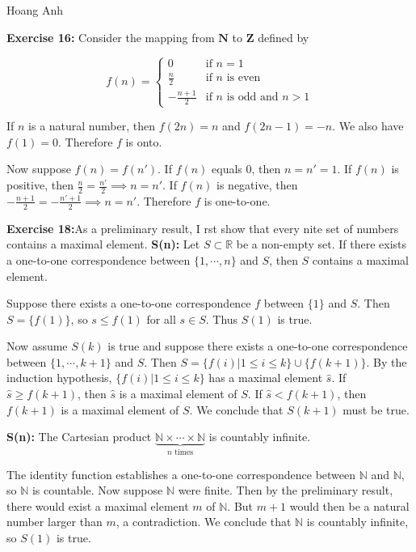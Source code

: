 Hoang Anh


\textbf{Exercise 16:} Consider the mapping from $\mathbf{N}$ to $\mathbf{Z}$ defined by

\[ f(n) = \begin{cases}
0 & \text{if } n = 1 \\
\frac{n}{2} & \text{if } n \text{ is even} \\
-\frac{n+1}{2} & \text{if } n \text{ is odd and } n > 1
\end{cases} \]

If $n$ is a natural number, then $f(2n) = n$ and $f(2n-1) = -n$. We also have $f(1) = 0$. Therefore $f$ is onto.

Now suppose $f(n) = f(n')$. If $f(n)$ equals 0, then $n = n' = 1$. If $f(n)$ is positive, then $\frac{n}{2} = \frac{n'}{2} \implies n = n'$. If $f(n)$ is negative, then $-\frac{n+1}{2} = -\frac{n'+1}{2} \implies n = n'$. Therefore $f$ is one-to-one.

\textbf{Exercise 18:}As a preliminary result, I rst show that every nite set of numbers contains a maximal element.
\textbf{S(n):} Let $S \subset \mathbb{R}$ be a non-empty set. If there exists a one-to-one correspondence between $\{1, \cdots, n\}$ and $S$, then $S$ contains a maximal element.

Suppose there exists a one-to-one correspondence $f$ between $\{1\}$ and $S$. Then $S = \{f(1)\}$, so $s \le f(1)$ for all $s \in S$. Thus $S(1)$ is true.

Now assume $S(k)$ is true and suppose there exists a one-to-one correspondence between $\{1, \cdots, k+1\}$ and $S$. Then $S = \{f(i) | 1 \le i \le k\} \cup \{f(k+1)\}$. By the induction hypothesis, $\{f(i) | 1 \le i \le k\}$ has a maximal element $\hat{s}$. If $\hat{s} \ge f(k+1)$, then $\hat{s}$ is a maximal element of $S$. If $\hat{s} < f(k+1)$, then $f(k+1)$ is a maximal element of $S$. We conclude that $S(k+1)$ must be true.

\vspace{1em}

\textbf{S(n):} The Cartesian product $\underbrace{\mathbb{N} \times \cdots \times \mathbb{N}}_{n \text{ times}}$ is countably infinite.

The identity function establishes a one-to-one correspondence between $\mathbb{N}$ and $\mathbb{N}$, so $\mathbb{N}$ is countable. Now suppose $\mathbb{N}$ were finite. Then by the preliminary result, there would exist a maximal element $m$ of $\mathbb{N}$. But $m+1$ would then be a natural number larger than $m$, a contradiction. We conclude that $\mathbb{N}$ is countably infinite, so $S(1)$ is true.

